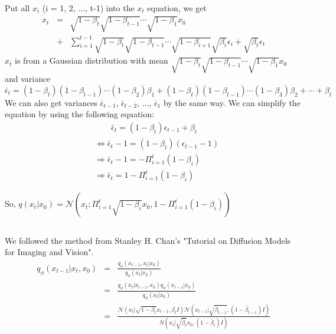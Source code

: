 \documentclass[12pt]{article}
\begin{document}
Put all $x_i$ (i = 1, 2, ..., t-1) into the $x_t$ equation, we get
\begin{eqnarray}
    x_t & = & \sqrt{1 - \beta_t}\sqrt{1 - \beta_{t-1}}\cdots\sqrt{1 - \beta_1}x_0 \nonumber \\
     \quad &+& \sum_{i =  1}^{t-1}\sqrt{1 - \beta_t}\sqrt{1 - \beta_{t-1}}\cdots\sqrt{1 - \beta_{i+1}}\sqrt{\beta_i}\epsilon_i + \sqrt{\beta_t}\epsilon_t \nonumber
\end{eqnarray}
$x_t$ is from a Gaussian distribution with mean $\sqrt{1 - \beta_t}\sqrt{1 - \beta_{t-1}}\cdots\sqrt{1 - \beta_1}x_0$ and variance
\begin{equation}
    \bar{\epsilon}_t = (1 - \beta_t)(1 - \beta_{t-1})\cdots(1 - \beta_2)\beta_1 + (1 - \beta_t)(1 - \beta_{t-1})\cdots(1 - \beta_3)\beta_2 + \cdots + \beta_t \nonumber
\end{equation} 
We can also get variances $\bar{\epsilon}_{t-1}$, $\bar{\epsilon}_{t-2}$, ..., $\bar{\epsilon}_1$ by the same way. We can simplify the equation by using the following equation:
\begin{align}
    & \quad\quad \bar{\epsilon}_{t}  =  (1 - \beta_t)\epsilon_{t-1} + \beta_t \nonumber \\
    &\Leftrightarrow \bar{\epsilon}_{t} - 1  =  (1 - \beta_t)(\epsilon_{t-1} - 1) \nonumber \\
    &\Rightarrow \bar{\epsilon}_{t} - 1  =  -\Pi_{i=1}^{t}(1 - \beta_i) \nonumber \\
    &\Rightarrow \bar{\epsilon}_{t}  =  1 -\Pi_{i=1}^{t}(1 - \beta_i) \nonumber
\end{align}

So, $q(x_t|x_0) = \mathcal{N}(x_t; \Pi_{i=1}^{t}\sqrt{1 - \beta_i}x_0, 1 -\Pi_{i=1}^{t}(1 - \beta_i))  $


\subsection{}
We followed the method from Stanley H. Chan's "Tutorial on Diffusion Models for Imaging and Vision".
\begin{eqnarray}
    q_\phi(x_{t-1} | x_t, x_0) &=& \frac{q_\phi (x_{t-1}, x_t | x_0) }{q_\phi(x_t | x_0)} \nonumber \\
    &=& \frac{q_\phi (x_{t} | x_{t-1}, x_0)q_\phi(x_{t-1} | x_0) }{q_\phi(x_t | x_0)} \nonumber \\
    &=& \frac{\mathcal{N}(x_t|\sqrt{1-\beta _t}x_{t-1}, \beta_tI)\mathcal{N} (x_{t-1}|\sqrt{\bar{\beta}_{t-1}}, (1-\bar{\beta}_{t-1})I)} { N(x_t|\sqrt{\bar{\beta}_{t}}x_0, (1-\bar{\beta}_{t})I)} \nonumber \\
\end{eqnarray}
\end{document}
